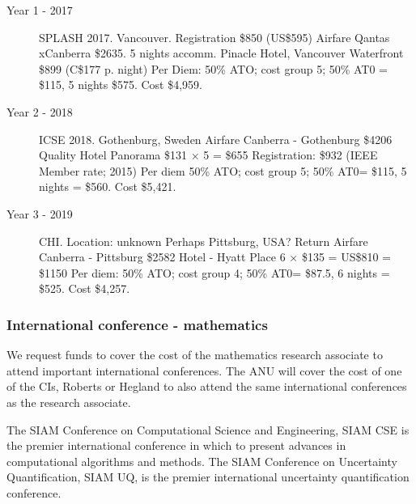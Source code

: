 \documentclass[a4paper,fontsize=12pt]{scrartcl}
\begin{document}
\begin{description}
\item[Year 1 - 2017] SPLASH 2017.
Vancouver. 
Registration \$850 (US\$595) 
Airfare Qantas xCanberra \$2635. 
5 nights accomm. Pinacle Hotel, Vancouver Waterfront \$899 (C\$177 p. night)
Per Diem: 50\% ATO; cost group 5; 50\% AT0 = \$115, 
5 nights \$575. Cost \$4,959.


\item[Year 2 - 2018] ICSE 2018.
Gothenburg, Sweden
Airfare Canberra - Gothenburg \$4206
Quality Hotel Panorama \$131 $\times$ 5 = \$655
Registration: \$932 (IEEE Member rate; 2015)
Per diem 50\% ATO; cost group 5; 50\% AT0= \$115, 
5 nights = \$560. Cost \$5,421.


\item[Year 3 - 2019] CHI.
Location: unknown
Perhaps Pittsburg, USA?
Return Airfare Canberra - Pittsburg \$2582
Hotel - Hyatt Place 6 $\times$ \$135 = US\$810 = \$1150
Per diem: 50\% ATO; cost group 4; 50\% AT0= \$87.5, 6 nights = \$525. Cost \$4,257.

\end{description}


\subsubsection*{International conference - mathematics}


We request funds to cover the cost of the mathematics research associate to attend important international conferences.  The ANU will cover the cost of one of the CIs, Roberts or Hegland to also attend the same international conferences as the research associate. 

The SIAM Conference on Computational Science and Engineering, SIAM CSE is the premier international conference in which to present advances in computational algorithms and methods. 
The SIAM Conference on Uncertainty Quantification, SIAM UQ, is the premier international uncertainty quantification conference.
\end{document}
